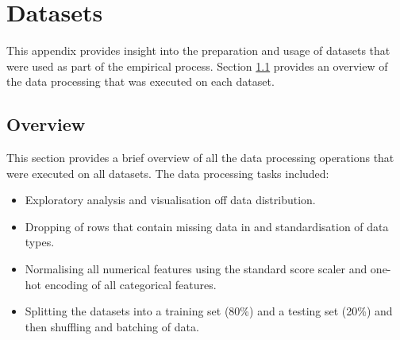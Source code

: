 \chapter{Datasets}
\label{app:datasets}

This appendix provides insight into the preparation and usage of datasets that were used as part of the empirical process. Section \ref{app:datasets:overview} provides an overview of the data processing that was executed on each dataset.

\section{Overview}\label{app:datasets:overview}

This section provides a brief overview of all the data processing operations that were executed on all datasets. The data processing tasks included:

\begin{itemize}
	\item Exploratory analysis and visualisation off data distribution.

	\item Dropping of rows that contain missing data in and standardisation of data types.

	\item Normalising all numerical features using the standard score scaler and one-hot encoding of all categorical features.

	\item Splitting the datasets into a training set (80\%) and a testing set (20\%) and then shuffling and batching of data.
\end{itemize}
